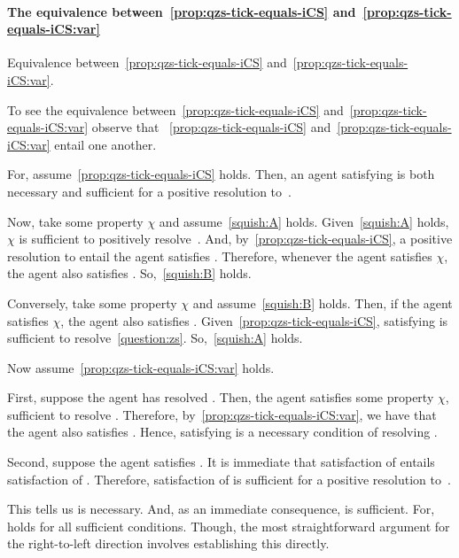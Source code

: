 \paragraph*{The equivalence between~\autoref{prop:qzs-tick-equals-iCS} and~\autoref{prop:qzs-tick-equals-iCS:var}}

\begin{note}
  \begin{proposition}
    Equivalence between~\autoref{prop:qzs-tick-equals-iCS} and~\autoref{prop:qzs-tick-equals-iCS:var}.
  \end{proposition}
\end{note}

\begin{note}
  To see the equivalence between~\autoref{prop:qzs-tick-equals-iCS} and~\autoref{prop:qzs-tick-equals-iCS:var} observe that ~\autoref{prop:qzs-tick-equals-iCS} and~\autoref{prop:qzs-tick-equals-iCS:var} entail one another.

  For, assume~\autoref{prop:qzs-tick-equals-iCS} holds.
  Then, an agent satisfying \iZS{} is both necessary and sufficient for a positive resolution to~\qzS{}.

  Now, take some property \(\chi\) and assume~\ref{squish:A} holds.
  Given~\ref{squish:A} holds, \(\chi\) is sufficient to positively resolve~\qzS{}.
  And, by~\autoref{prop:qzs-tick-equals-iCS}, a positive resolution to \qzS{} entail the agent satisfies \iZS{}.
  Therefore, whenever the agent satisfies \(\chi\), the agent also satisfies \iZS{}.
  So,~\ref{squish:B} holds.

  Conversely, take some property \(\chi\) and assume~\ref{squish:B} holds.
  Then, if the agent satisfies \(\chi\), the agent also satisfies \iZS{}.
  Given~\autoref{prop:qzs-tick-equals-iCS}, satisfying \iZS{} is sufficient to resolve~\autoref{question:zs}.
  So,~\ref{squish:A} holds.

  Now assume~\autoref{prop:qzs-tick-equals-iCS:var} holds.

  First, suppose the agent has resolved \qzS{}.
  Then, the agent satisfies some property \(\chi\), sufficient to resolve \qzS{}.
  Therefore, by~\autoref{prop:qzs-tick-equals-iCS:var}, we have that the agent also satisfies \iZS{}.
  Hence, satisfying \iZS{} is a necessary condition of resolving \qzS{}.

  Second, suppose the agent satisfies \iZS{}.
  It is immediate that satisfaction of \iZS{} entails satisfaction of \iZS{}.
  Therefore, satisfaction of \iZS{} is sufficient for a positive resolution to~\qzS{}.

  This tells us \iZS{} is necessary.
  And, as an immediate consequence, \iZS{} is sufficient.
  For, holds for all sufficient conditions.
  Though, the most straightforward argument for the right-to-left direction involves establishing this directly.
\end{note}

